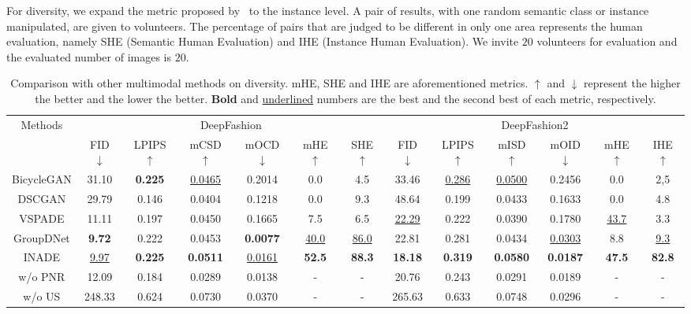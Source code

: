 \documentclass[final]{cvpr}
\begin{document}
For diversity, we expand the metric proposed by~\cite{zhu2020semantically} to the instance level. A pair of results, with one random semantic class or instance manipulated, are given to volunteers. The percentage of pairs that are judged to be different in only one area represents the human evaluation, namely SHE (Semantic Human Evaluation) and IHE (Instance Human Evaluation). We invite $20$ volunteers for evaluation and the evaluated number of images is $20$.


\begin{table*}[t]
\setlength{\tabcolsep}{1.6mm}
    \centering
    \caption{Comparison with other multimodal methods on diversity. mHE, SHE and IHE are aforementioned metrics.
    $\uparrow$ and $\downarrow$ represent the higher the better and the lower the better. \textbf{Bold} and \underline{underlined} numbers are the best and the second best of each metric, respectively.}
    \small
    \begin{tabular}{c|c|c|c|c|c|c|c|c|c|c|c|c}
    \hline
        \multirow{2}{*}{Methods} & \multicolumn{6}{c|}{DeepFashion} & \multicolumn{6}{c}{DeepFashion2}\\
        \cline{2-13}
         & FID $\downarrow$ & LPIPS $\uparrow$ & mCSD $\uparrow$ & mOCD $\downarrow$ & mHE $\uparrow$ & SHE $\uparrow$ & FID $\downarrow$ & LPIPS $\uparrow$ & mISD $\uparrow$ & mOID $\downarrow$ & mHE $\uparrow$ & IHE $\uparrow$\\
        \hline
        BicycleGAN & 31.10 & \textbf{0.225} & \underline{0.0465} & 0.2014 & 0.0 & 4.5 & 33.46 & \underline{0.286} & \underline{0.0500} & 0.2456 & 0.0 & 2,5\\
        \hline
        DSCGAN & 29.79 & 0.146 & 0.0404 & 0.1218 & 0.0 & 9.3 & 48.64 & 0.199 & 0.0433 & 0.1633 & 0.0 & 4.8\\
        \hline
        VSPADE & 11.11 & 0.197 & 0.0450 & 0.1665 & 7.5 & 6.5 & \underline{22.29} & 0.222 & 0.0390 & 0.1780 & \underline{43.7} & 3.3\\
        \hline
        GroupDNet & \textbf{9.72} & 0.222 & 0.0453 & \textbf{0.0077} & \underline{40.0} & \underline{86.0} & 22.81 & 0.281 & 0.0434 & \underline{0.0303} & 8.8 & \underline{9.3}\\
        \hline
        INADE & \underline{9.97} & \textbf{0.225} & \textbf{0.0511} & \underline{0.0161} & \textbf{52.5} & \textbf{88.3} & \textbf{18.18} & \textbf{0.319} & \textbf{0.0580} & \textbf{0.0187} & \textbf{47.5} & \textbf{82.8}\\
        \hline
        \hline
        w/o PNR & 12.09 & 0.184 & 0.0289 & 0.0138 & - & - & 20.76 & 0.243 & 0.0291 & 0.0189 & - & -\\
        \hline
        w/o US & 248.33 & 0.624 & 0.0730 & 0.0370 & - & - & 265.63 & 0.633 & 0.0748 & 0.0296 & - & -\\
        \hline
    \end{tabular}
    \label{tab:comp_diversity}
\end{table*}{}
\end{document}
